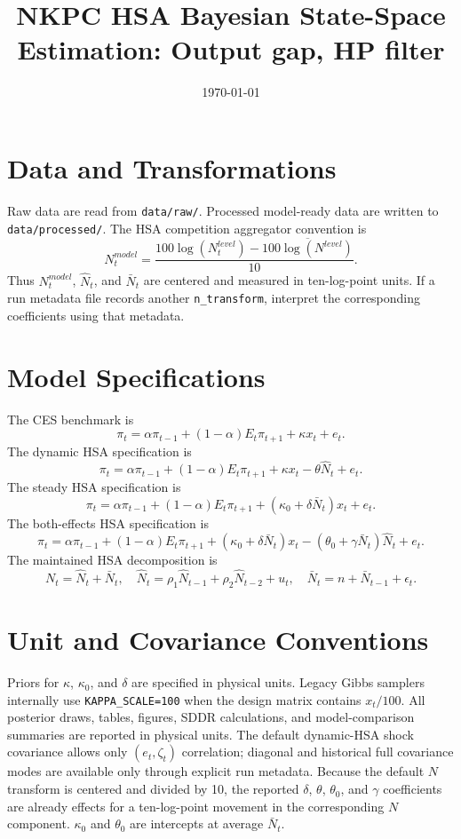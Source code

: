 \documentclass[11pt]{article}
\title{NKPC HSA Bayesian State-Space Estimation: Output gap, HP filter}
\author{}
\date{\today}
\begin{document}
\maketitle

\section{Data and Transformations}
Raw data are read from \texttt{data/raw/}. Processed model-ready data are written to
\texttt{data/processed/}. The HSA competition aggregator convention is
\[
N^{model}_t=\frac{100\log(N^{level}_t)-\overline{100\log(N^{level})}}{10}.
\]
Thus \(N^{model}_t\), \(\hat N_t\), and \(\bar N_t\) are centered and measured
in ten-log-point units. If a run metadata file records another
\texttt{n\_transform}, interpret the corresponding coefficients using that
metadata.

\section{Model Specifications}
The CES benchmark is
\[
\pi_t=\alpha \pi_{t-1}+(1-\alpha)E_t\pi_{t+1}+\kappa x_t+e_t.
\]
The dynamic HSA specification is
\[
\pi_t=\alpha \pi_{t-1}+(1-\alpha)E_t\pi_{t+1}+\kappa x_t-\theta\hat N_t+e_t.
\]
The steady HSA specification is
\[
\pi_t=\alpha \pi_{t-1}+(1-\alpha)E_t\pi_{t+1}+(\kappa_0+\delta\bar N_t)x_t+e_t.
\]
The both-effects HSA specification is
\[
\pi_t=\alpha \pi_{t-1}+(1-\alpha)E_t\pi_{t+1}
+(\kappa_0+\delta\bar N_t)x_t-(\theta_0+\gamma\bar N_t)\hat N_t+e_t.
\]
The maintained HSA decomposition is
\[
N_t=\hat N_t+\bar N_t,\quad
\hat N_t=\rho_1\hat N_{t-1}+\rho_2\hat N_{t-2}+u_t,\quad
\bar N_t=n+\bar N_{t-1}+\epsilon_t.
\]

\section{Unit and Covariance Conventions}
Priors for \(\kappa\), \(\kappa_0\), and \(\delta\) are specified in
physical units. Legacy Gibbs samplers internally use \texttt{KAPPA\_SCALE=100}
when the design matrix contains \(x_t/100\). All posterior draws, tables,
figures, SDDR calculations, and model-comparison summaries are reported in
physical units. The default dynamic-HSA shock covariance allows only
\((e_t,\zeta_t)\) correlation; diagonal and historical full covariance modes
are available only through explicit run metadata.
Because the default \(N\) transform is centered and divided by 10, the reported
\(\delta\), \(\theta\), \(\theta_0\), and \(\gamma\) coefficients are already
effects for a ten-log-point movement in the corresponding \(N\) component.
\(\kappa_0\) and \(\theta_0\) are intercepts at average \(\bar N_t\).
\end{document}
